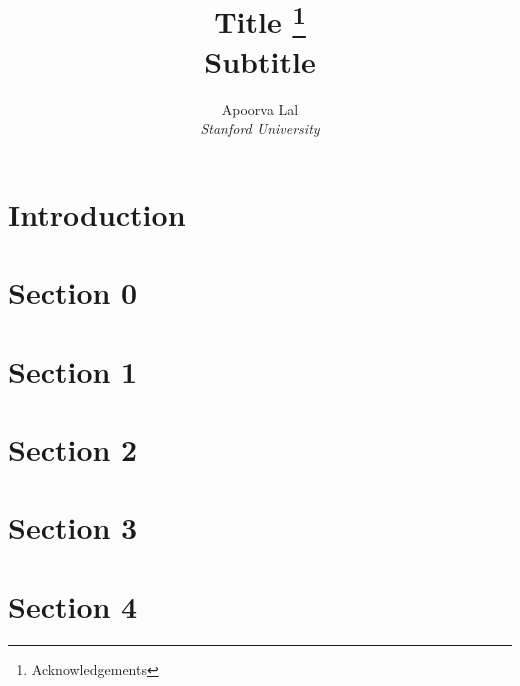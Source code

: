\documentclass[a4paper, 12pt]{article}
\title{Title \thanks{Acknowledgements} \\
  \large Subtitle}
\author{
  Apoorva Lal \\
  \emph{Stanford University}
}
\begin{document}
\begin{titlingpage}
    \maketitle
    \begin{abstract}
        \lipsum[4]
    \end{abstract}
\end{titlingpage}


\section*{Introduction}


\cite{Deatonanalysishouseholdsurveys1997}

\parencite{Acemoglucolonialoriginscomparative2001}


\section{Section 0}
\lipsum[2]

\section{Section 1}
\lipsum[3]

\section{Section 2}
\lipsum[3]

\section{Section 3}
\lipsum[4]

\section{Section 4}
\lipsum[7]

\renewcommand{\mkbibnamefamily}[1]{\textsc{#1}} %
\printbibliography
\end{document}
